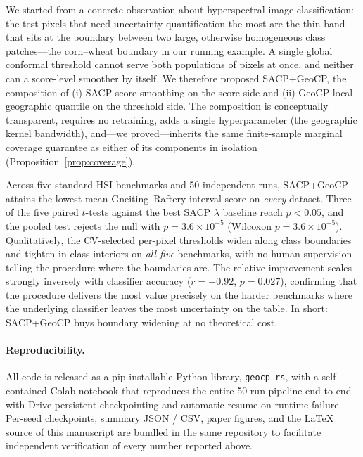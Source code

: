 \documentclass[11pt]{article}
\newcommand{\1}{\mathbf{1}}
\begin{document}
We started from a concrete observation about hyperspectral image classification: the test pixels that need uncertainty quantification the most are the thin band that sits at the boundary between two large, otherwise homogeneous class patches---the corn--wheat boundary in our running example. A single global conformal threshold cannot serve both populations of pixels at once, and neither can a score-level smoother by itself. We therefore proposed SACP+GeoCP, the composition of (i) SACP score smoothing on the score side and (ii) GeoCP local geographic quantile on the threshold side. The composition is conceptually transparent, requires no retraining, adds a single hyperparameter (the geographic kernel bandwidth), and---we proved---inherits the same finite-sample marginal coverage guarantee as either of its components in isolation (Proposition~\ref{prop:coverage}).

Across five standard HSI benchmarks and 50 independent runs, SACP+GeoCP attains the lowest mean Gneiting--Raftery interval score on \emph{every} dataset. Three of the five paired $t$-tests against the best SACP $\lambda$ baseline reach $p < 0.05$, and the pooled test rejects the null with $p = 3.6 \times 10^{-5}$ (Wilcoxon $p = 3.6 \times 10^{-5}$). Qualitatively, the CV-selected per-pixel thresholds widen along class boundaries and tighten in class interiors on \emph{all five} benchmarks, with no human supervision telling the procedure where the boundaries are. The relative improvement scales strongly inversely with classifier accuracy ($r = -0.92$, $p = 0.027$), confirming that the procedure delivers the most value precisely on the harder benchmarks where the underlying classifier leaves the most uncertainty on the table. In short: SACP+GeoCP buys boundary widening at no theoretical cost.

\paragraph{Reproducibility.} All code is released as a pip-installable Python library, \texttt{geocp-rs}, with a self-contained Colab notebook that reproduces the entire 50-run pipeline end-to-end with Drive-persistent checkpointing and automatic resume on runtime failure. Per-seed checkpoints, summary JSON / CSV, paper figures, and the LaTeX source of this manuscript are bundled in the same repository to facilitate independent verification of every number reported above.



\end{document}

